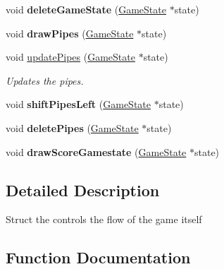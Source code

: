 \begin{DoxyCompactItemize}
\item 
void {\bfseries delete\+Game\+State} (\hyperlink{structGameState}{Game\+State} $\ast$state)\hypertarget{group__GameState_ga9bb21c9548ad7822e7db855481317c05}{}\label{group__GameState_ga9bb21c9548ad7822e7db855481317c05}

\item 
void {\bfseries draw\+Pipes} (\hyperlink{structGameState}{Game\+State} $\ast$state)\hypertarget{group__GameState_gadc30ea2223223ab0e27daccd6e57fdab}{}\label{group__GameState_gadc30ea2223223ab0e27daccd6e57fdab}

\item 
void \hyperlink{group__GameState_ga960e38fbbbc119878704a2f633211108}{update\+Pipes} (\hyperlink{structGameState}{Game\+State} $\ast$state)
\begin{DoxyCompactList}\small\item\em Updates the pipes. \end{DoxyCompactList}\item 
void {\bfseries shift\+Pipes\+Left} (\hyperlink{structGameState}{Game\+State} $\ast$state)\hypertarget{group__GameState_ga49f81c06d345d16a7b880bad72ab5bd7}{}\label{group__GameState_ga49f81c06d345d16a7b880bad72ab5bd7}

\item 
void {\bfseries delete\+Pipes} (\hyperlink{structGameState}{Game\+State} $\ast$state)\hypertarget{group__GameState_gac91fdcc3e45c017117f8dd5cb2928373}{}\label{group__GameState_gac91fdcc3e45c017117f8dd5cb2928373}

\item 
void {\bfseries draw\+Score\+Gamestate} (\hyperlink{structGameState}{Game\+State} $\ast$state)\hypertarget{group__GameState_gaee253d193f21c335d237dd9cbb82056b}{}\label{group__GameState_gaee253d193f21c335d237dd9cbb82056b}

\end{DoxyCompactItemize}


\subsection{Detailed Description}
Struct the controls the flow of the game itself 

\subsection{Function Documentation}
